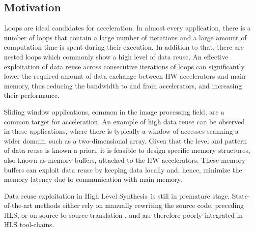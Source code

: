 \documentclass[]{usiinfthesis}
\newcommand{\HLS}{{High Level Synthesis}}
\begin{document}
\subsection{Motivation}



Loops are ideal candidates for acceleration. In almost every application, there is a
number of loops that contain a large number of iterations and a large amount of computation time is
spent during their execution. In addition to that, there are 
nested loops which commonly show a high level of data reuse. An effective exploitation
of data reuse across consecutive iterations of loops can significantly lower the required
amount of data exchange between HW accelerators and main memory, thus reducing the  bandwidth to and from accelerators, and increasing their performance.\par

 Sliding window applications, common in the image processing field, are a common target for acceleration.
An example of high
data reuse can be observed in these applications, where there is typically
a window of accesses scanning a wider domain, such as a two-dimensional array. 
Given that the level and pattern of data reuse is known a priori, it is feasible 
to design specific memory structures, also known as memory buffers, attached to the 
HW accelerators. These memory buffers can exploit data reuse by keeping data locally 
and, hence, minimize the memory latency due to communication with main memory.\par

Data reuse exploitation in \HLS\ is still in premature stage.
State-of-the-art methods \cite{Vivado12} either rely on manually rewriting the source code, preceding HLS, 
or on source-to-source translation \cite{PouchetFeb13} \cite{SchmidJul15}, and are therefore 
poorly integrated in HLS tool-chains.\par
    
\end{document}
